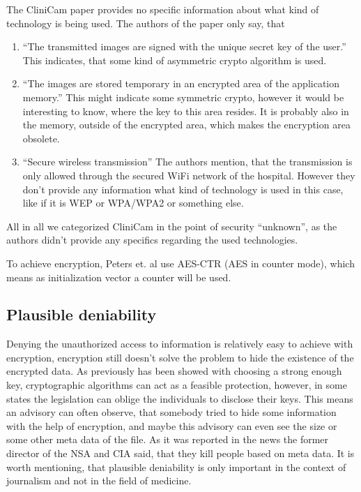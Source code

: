 \documentclass[12pt,a4paper,titlepage,oneside]{scrartcl}
\begin{document}
The CliniCam paper provides no specific information about what kind of technology is being used.
The authors of the paper only say, that
\begin{enumerate}[label={\alph*}]
  \item ``The transmitted images are signed with the unique secret key of the user.''
    This indicates, that some kind of asymmetric crypto algorithm is used.
  \item ``The images are stored temporary in an encrypted area of the application memory.''
    This might indicate some symmetric crypto, however it would be interesting to know, where the key to this area resides.
    It is probably also in the memory, outside of the encrypted area, which makes the encryption area obsolete.
  \item ``Secure wireless transmission''
    The authors mention, that the transmission is only allowed through the secured WiFi network of the hospital.
    However they don't provide any information what kind of technology is used in this case, like if it is WEP or WPA/WPA2 or something else.
\end{enumerate}
All in all we categorized CliniCam in the point of security ``unknown'', as the authors didn't provide any specifics regarding the used technologies. \cite{pmid25565678}

To achieve encryption, Peters et. al use AES-CTR (AES in counter mode), which means as initialization vector a counter will be used. \cite{peters2015defy}

\subsection{Plausible deniability}
Denying the unauthorized access to information is relatively easy to achieve with encryption, encryption still doesn't solve the problem to hide the existence of the encrypted data.
As previously has been showed with choosing a strong enough key, cryptographic algorithms can act as a feasible protection, however, in some states the legislation can oblige the individuals to disclose their keys.
This means an advisory can often observe, that somebody tried to hide some information with the help of encryption, and maybe this advisory can even see the size or some other meta data of the file.
As it was reported in the news the former director of the NSA and CIA said, that they kill people based on meta data. \cite{coleMetadata}
It is worth mentioning, that plausible deniability is only important in the context of journalism and not in the field of medicine.
\end{document}
